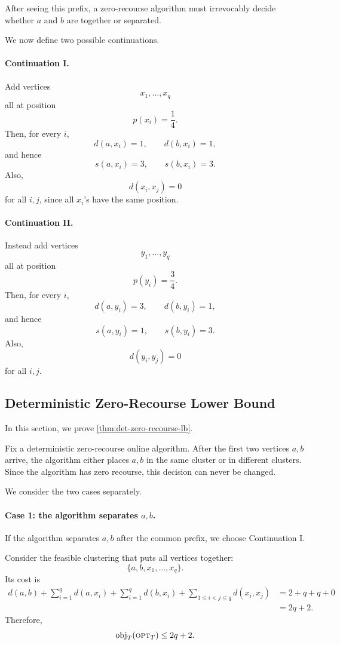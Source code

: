 After seeing this prefix, a zero-recourse algorithm must irrevocably decide whether \(a\) and \(b\) are together or separated.

We now define two possible continuations.

\paragraph{Continuation I.}
Add vertices
\[
    x_1,\ldots,x_q
\]
all at position
\[
    p(x_i)=\frac14.
\]
Then, for every \(i\),
\[
    d(a,x_i)=1,
    \qquad
    d(b,x_i)=1,
\]
and hence
\[
    s(a,x_i)=3,
    \qquad
    s(b,x_i)=3.
\]
Also,
\[
    d(x_i,x_j)=0
\]
for all \(i,j\), since all \(x_i\)'s have the same position.

\paragraph{Continuation II.}
Instead add vertices
\[
    y_1,\ldots,y_q
\]
all at position
\[
    p(y_i)=\frac34.
\]
Then, for every \(i\),
\[
    d(a,y_i)=3,
    \qquad
    d(b,y_i)=1,
\]
and hence
\[
    s(a,y_i)=1,
    \qquad
    s(b,y_i)=3.
\]
Also,
\[
    d(y_i,y_j)=0
\]
for all \(i,j\).

\subsection{Deterministic Zero-Recourse Lower Bound}

In this section, we prove \cref{thm:det-zero-recourse-lb}.

Fix a deterministic zero-recourse online algorithm. After the first two vertices \(a,b\) arrive, the algorithm either places \(a,b\) in the same cluster or in different clusters. Since the algorithm has zero recourse, this decision can never be changed.

We consider the two cases separately.

\paragraph{Case 1: the algorithm separates \(a,b\).}
If the algorithm separates \(a,b\) after the common prefix, we choose Continuation I.

Consider the feasible clustering that puts all vertices together:
\[
    \{a,b,x_1,\ldots,x_q\}.
\]
Its cost is
\[
\begin{aligned}
    d(a,b)
    +
    \sum_{i=1}^q d(a,x_i)
    +
    \sum_{i=1}^q d(b,x_i)
    +
    \sum_{1\le i<j\le q} d(x_i,x_j)
    &=
    2+q+q+0\\
    &=
    2q+2.
\end{aligned}
\]
Therefore,
\[
    \text{obj}_T(\textsc{opt}_T)\le 2q+2.
\]

